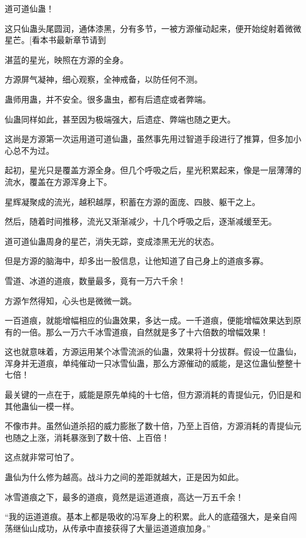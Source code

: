 
\begin{this_body}

道可道仙蛊！

这只仙蛊头尾圆润，通体漆黑，分有多节，一被方源催动起来，便开始绽射着微微星芒。[看本书最新章节请到

湛蓝的星光，映照在方源的全身。

方源屏气凝神，细心观察，全神戒备，以防任何不测。

蛊师用蛊，并不安全。很多蛊虫，都有后遗症或者弊端。

仙蛊同样如此，甚至因为极端强大，后遗症、弊端也随之更大。

这尚是方源第一次运用道可道仙蛊，虽然事先用过智道手段进行了推算，但多加小心总不为过。

起初，星光只是覆盖方源全身。但几个呼吸之后，星光积累起来，像是一层薄薄的流水，覆盖在方源浑身上下。

星辉凝聚成的流光，越积越厚，积蓄在方源的面庞、四肢、躯干之上。

然后，随着时间推移，流光又渐渐减少，十几个呼吸之后，逐渐减缓至无。

道可道仙蛊周身的星芒，消失无踪，变成漆黑无光的状态。

但是方源的脑海中，却多出一股信息，让他知道了自己身上的道痕多寡。

雪道、冰道的道痕，数量最多，竟有一万六千余！

方源乍然得知，心头也是微微一跳。

一百道痕，就能增幅相应的仙蛊效果，多达一成。一千道痕，便能增幅效果达到原有的一倍。那么一万六千冰雪道痕，自然就是多了十六倍数的增幅效果！

这也就意味着，方源运用某个冰雪流派的仙蛊，效果将十分拔群。假设一位蛊仙，浑身并无道痕，单纯催动一只冰雪仙蛊，那么方源催动的威能，是这位蛊仙整整十七倍！

最关键的一点在于，威能是原先单纯的十七倍，但方源消耗的青提仙元，仍旧是和其他蛊仙一模一样。

不像市井。虽然仙道杀招的威力膨胀了数十倍，乃至上百倍，方源消耗的青提仙元也随之上涨，消耗暴涨到了数十倍、上百倍！

这点就非常可怕了。

蛊仙为什么修为越高。战斗力之间的差距就越大，正是因为如此。

冰雪道痕之下，最多的道痕，竟然是运道道痕，高达一万五千余！

“我的运道道痕。基本上都是吸收的冯军身上的积累。此人的底蕴强大，是亲自闯荡继仙山成功，从传承中直接获得了大量运道道痕加身。”


\end{this_body}
